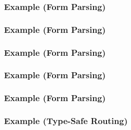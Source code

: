 \begin{frame}
  \frametitle{Example (Form Parsing)}
  
\end{frame}

\begin{frame}
  \frametitle{Example (Form Parsing)}
  
\end{frame}

\begin{frame}
  \frametitle{Example (Form Parsing)}
  
\end{frame}

\begin{frame}
  \frametitle{Example (Form Parsing)}
  
\end{frame}


\begin{frame}
  \frametitle{Example (Form Parsing)}
  
\end{frame}

\begin{frame}
\end{frame}

\begin{frame}
\end{frame}

\begin{frame}
  \frametitle{Example (Type-Safe Routing)}
  
\end{frame}


